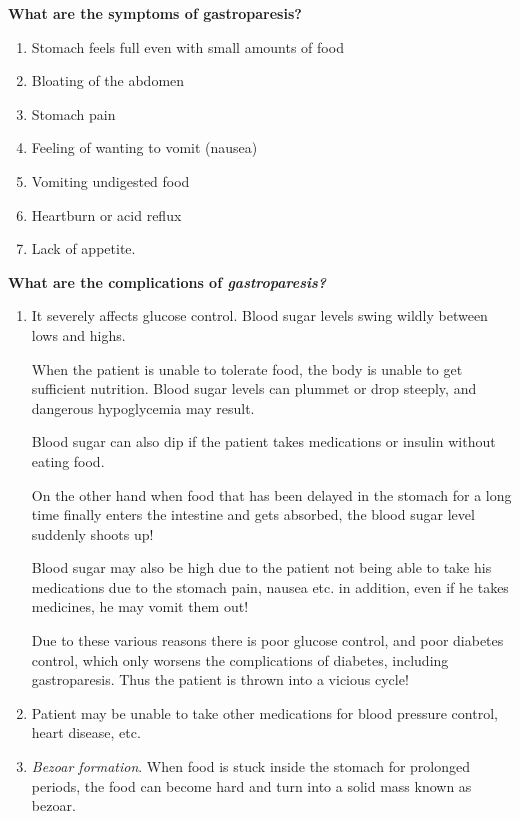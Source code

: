 \noindent\textbf{What are the symptoms of gastroparesis?}
\begin{enumerate}[•]
\itemsep=0pt
\item Stomach feels full even with small amounts of food
\item Bloating of the abdomen
\item Stomach pain
\item Feeling of wanting to vomit (nausea)
\item Vomiting undigested food
\item Heartburn or acid reflux
\item Lack of appetite.
\end{enumerate}

\noindent\textbf{What are the complications of \textit{gastroparesis?}}

\begin{enumerate}[\ding{118}] 
\itemsep=0pt
\item It severely affects glucose control. Blood sugar levels swing wildly between lows and highs.

When the patient is unable to tolerate food, the body is unable to get sufficient nutrition. Blood sugar levels can plummet or drop steeply, and dangerous hypoglycemia may result.

Blood sugar can also dip if the patient takes medications or insulin without eating food.

On the other hand when food that has been delayed in the stomach for a long time finally enters the intestine and gets absorbed, the blood sugar level suddenly shoots up!

Blood sugar may also be high due to the patient not being able to take his medications due to the stomach pain, nausea etc. in addition, even if he takes medicines, he may vomit them out!

Due to these various reasons there is poor glucose control, and poor diabetes control, which only worsens the complications of diabetes, including gastroparesis. Thus the patient is thrown into a vicious cycle!
\item Patient may be unable to take other medications for blood pressure control, heart disease, etc.
\item \textit{Bezoar formation}. When food is stuck inside the stomach for prolonged periods, the food can become hard and turn into a solid mass known as bezoar.
\end{enumerate}

